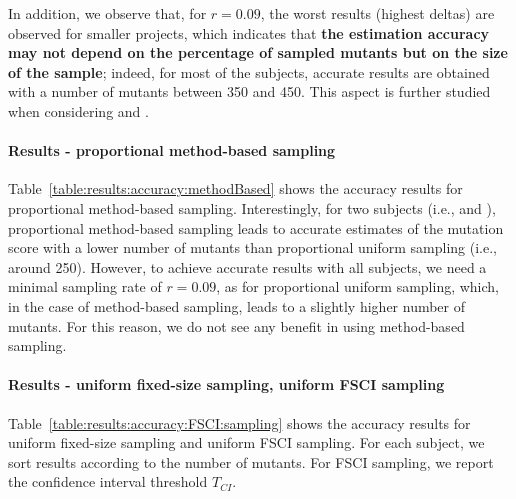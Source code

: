 

In addition, we observe that, for $r=0.09$, the worst results (highest deltas) are observed for smaller projects, which indicates that \textbf{the estimation accuracy may not depend on the percentage of sampled mutants but on the size of the sample}; indeed, for most of the subjects, accurate results  are obtained with a number of mutants between 350 and 450. This aspect is further studied when considering   and .

\paragraph{Results - proportional method-based sampling}

Table~\ref{table:results:accuracy:methodBased} shows the accuracy results for proportional method-based sampling. 
Interestingly, for two subjects (i.e., \GCSP{} and \UTIL{}), proportional method-based sampling leads to accurate estimates of the mutation score with a lower number of mutants than proportional uniform sampling (i.e., around 250).
However, to achieve accurate results with all subjects, we need a minimal sampling rate of $r=0.09$, as for proportional uniform sampling, which, in the case of method-based sampling, leads to a slightly higher number of mutants. For this reason, we do not see any benefit in using method-based sampling.




\paragraph{Results - uniform fixed-size sampling, uniform FSCI sampling}



Table~\ref{table:results:accuracy:FSCI:sampling} shows the accuracy results for uniform fixed-size sampling and uniform FSCI sampling. For each subject, we sort results according to the number of mutants. For FSCI sampling, we report the confidence interval threshold $T_\mathit{CI}$. 

